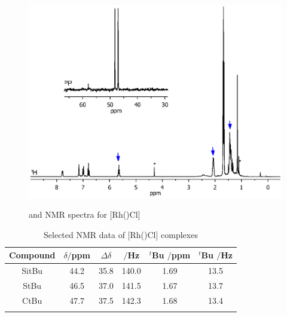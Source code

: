 \begin{figure}[htbp]
\begin{center}
\vspace{0.5cm}
\includegraphics[trim = 2.5cm 4.0cm 2.5cm 15cm, clip]{../NMR/7004B.eps}
\caption[\phosphorus{} and \proton{} NMR spectra for [Rh(\tBuxantphos)Cl{]}]{\phosphorus{} and \proton{} NMR spectra for [Rh(\tBuxantphos)Cl]}
\vspace{0.2cm}
\label{RhClnmr}
\end{center}
\end{figure}
\vspace{0.2cm}

\begin{table}[htbp]
\caption[Selected NMR data of [Rh(\tBuxantphos)Cl{]} complexes]{Selected NMR data of [Rh(\tBuxantphos)Cl] complexes}
\vspace{1em}
\label{table:rhodiumchloride}
\small
\begin{center}
\begin{tabular}{ c c c c c c}
	\toprule{}
	\bfseries{Compound}&\bfseries{$\delta$\phosphorus{}$/$ppm}&\bfseries{$\Delta\delta$}&\bfseries{\JRhP{}$/$Hz}&\bfseries{\proton{} \emph{$^t$}Bu $/$ppm}&\bfseries{\proton{} \emph{$^t$}Bu \J $/$Hz}\\
	\midrule{}
	SitBu	&	44.2	&	35.8	&	140.0	& 1.69	& 13.5\\
	StBu		& 	46.5	&	37.0	&	141.5	& 1.67	& 13.7\\
	CtBu		&	47.7	&	37.5	&	142.3	& 1.68	& 13.4\\
	\bottomrule{}
\end{tabular}
\end{center}
\end{table}

